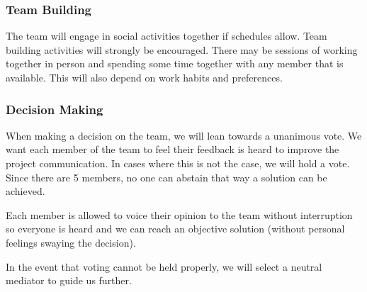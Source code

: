 \documentclass{article}
\begin{document}



\subsubsection*{Team Building}

The team will engage in social activities together if schedules allow. Team building activities will strongly be encouraged. There may be sessions of working together in person and spending some time together with any member that is available. This will also depend on work habits and preferences.

\subsubsection*{Decision Making} 

When making a decision on the team, we will lean towards a unanimous vote. We 
want each member of the team to feel their feedback is heard to improve the project 
communication. In cases where this is not the case, we will hold a vote. Since there 
are 5 members, no one can abstain that way a solution can be achieved. 


Each member is allowed to voice their opinion to the team without interruption so 
everyone is heard and we can reach an objective solution (without personal feelings 
swaying the decision). 


In the event that voting cannot be held properly, we will select a neutral mediator to 
guide us further.
\end{document}
